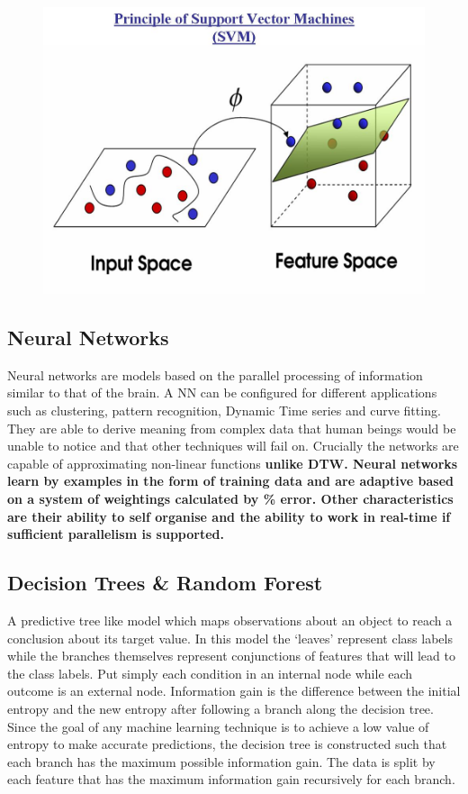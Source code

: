 \begin{figure}[h]
    \centering
    \includegraphics[height=0.25\textheight]{fig03/svm}
    \label{fig:kinect}
\end{figure}

\subsection{Neural Networks}
Neural networks are models based on the parallel processing of information similar to that of the brain. A NN can be configured for different applications such as clustering, pattern recognition, Dynamic Time series and curve fitting. They are able to derive meaning from complex data that human beings would be unable to notice and that other techniques will fail on. Crucially the networks are capable of approximating non-linear functions \textbf{unlike DTW. Neural networks learn by examples in the form of training data and are adaptive based on a system of weightings calculated by \% error. Other characteristics are their ability to self organise and the ability to work in real-time if sufficient parallelism is supported.}

\subsection{Decision Trees \& Random Forest}
A predictive tree like model which maps observations about an object to reach a conclusion about its target value. In this model the `leaves' represent class labels while the branches themselves represent conjunctions of features that will lead to the class labels. Put simply each condition in an internal node while each outcome is an external node. Information gain is the difference between the initial entropy and the new entropy after following a branch along the decision tree. Since the goal of any machine learning technique is to achieve a low value of entropy to make accurate predictions, the decision tree is constructed such that each branch has the maximum possible information gain. The data is split by each feature that has the maximum information gain recursively for each branch.

